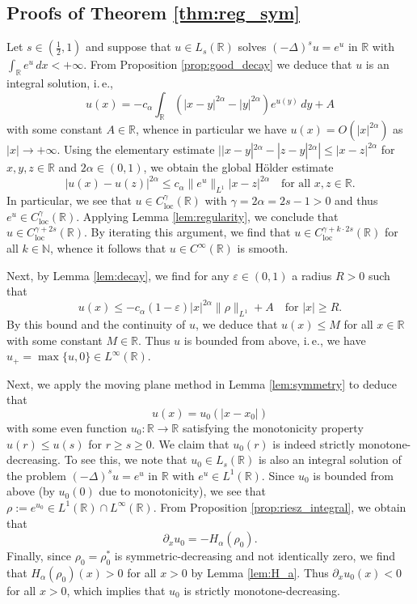 \documentclass[reqno,10pt,a4paper]{amsart}
\theoremstyle{definition}
\theoremstyle{definition}
\theoremstyle{remark}
\theoremstyle{remark}
\numberwithin{equation}{section}
\newcommand{\N}{\mathbb{N}}
\newcommand{\R}{\mathbb{R}}
\newcommand{\pt}{\partial}
\newcommand{\eps}{\varepsilon}
\newcommand{\Ds}{(-\Delta)^{s}}
\newcommand{\Cloc}{C_{\mathrm{loc}}}
\begin{document}
\subsection{Proofs of Theorem \ref{thm:reg_sym}}
Let $s \in (\frac{1}{2},1)$ and suppose that $u \in L_s(\R)$ solves $\Ds u = e^u$ in $\R$ with $\int_\R e^u \, dx < +\infty$. From Proposition \ref{prop:good_decay} we deduce that $u$ is an integral solution, i.\,e., 
$$
u(x) = -c_\alpha \int_{\R} (|x-y|^{2 \alpha} - |y|^{2 \alpha}) e^{u(y)} \, dy + A
$$
with some constant $A \in \R$, whence in particular we have $u(x) = O(|x|^{2 \alpha})$ as $|x| \to +\infty$. Using the elementary estimate $| |x-y|^{2\alpha}-|z-y|^{2 \alpha}| \leq |x-z|^{2 \alpha}$ for $x,y,z \in \R$ and $2 \alpha \in (0,1)$, we obtain the global H\"older estimate
$$
|u(x)-u(z)|^{2 \alpha} \leq c_\alpha \| e^u \|_{L^1} |x-z|^{2 \alpha} \quad \mbox{for all $x,z \in \R$}.
$$
In particular, we see that $u \in \Cloc^{\gamma}(\R)$ with $\gamma = 2 \alpha = 2s -1 > 0$ and thus $e^{u} \in \Cloc^{\gamma}(\R)$. Applying Lemma \ref{lem:regularity}, we conclude that $u \in \Cloc^{\gamma + 2s}(\R)$. By iterating this argument, we find that $u \in \Cloc^{\gamma + k \cdot 2s}(\R)$ for all $k \in \N$, whence it follows that $u \in C^\infty(\R)$ is smooth. 

Next, by Lemma \ref{lem:decay}, we find for any $\eps \in (0,1)$ a radius $R > 0$ such that
$$
u(x) \leq -c_\alpha(1-\eps) |x|^{2 \alpha} \| \rho \|_{L^1} + A \quad \mbox{for $|x| \geq R$}.
$$
By this bound and the continuity of $u$, we deduce that $u(x) \leq M$ for all $x \in \R$ with some constant $M \in \R$. Thus $u$ is bounded from above, i.\,e., we have $u_+ = \max \{ u,0 \} \in L^\infty(\R)$. 

Next, we apply the moving plane method in Lemma \ref{lem:symmetry} to deduce that
$$
u(x) = u_0(|x-x_0|) 
$$
with some even function $u_0 : \R \to \R$ satisfying the monotonicity property $u(r) \leq u(s)$ for $r \geq s \geq 0$. We claim that $u_0(r)$ is indeed strictly monotone-decreasing. To see this, we note that $u_0 \in L_s(\R)$ is also an integral solution of the problem $\Ds u = e^u$ in $\R$ with $e^u \in L^1(\R)$. Since $u_0$ is bounded from above (by $u_0(0)$ due to monotonicity), we see that $\rho := e^{u_0} \in L^1(\R) \cap L^\infty(\R)$. From Proposition  \ref{prop:riesz_integral}, we obtain that
$$
\pt_x u_0 = -H_\alpha(\rho_0) .
$$
Finally, since $\rho_0 = \rho_0^*$ is symmetric-decreasing and not identically zero, we find that $H_\alpha(\rho_0)(x) > 0$ for all $x > 0$ by Lemma \ref{lem:H_a}. Thus $\pt_x u_0(x) < 0$ for all $x>0$, which implies that $u_0$ is strictly monotone-decreasing. 
\end{document}
